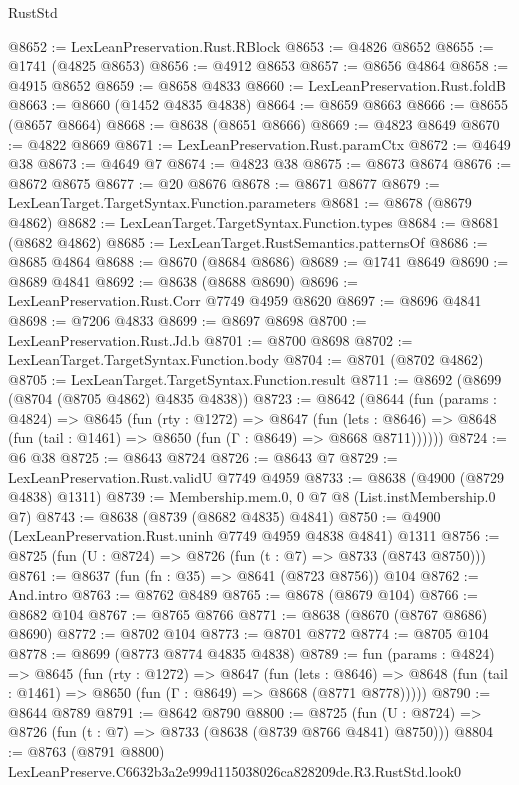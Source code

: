 \begin{lexlean}{RustStd}
\begin{coremodule}
@8652 := LexLeanPreservation.Rust.RBlock
@8653 := @4826 @8652
@8655 := @1741 (@4825 @8653)
@8656 := @4912 @8653
@8657 := @8656 @4864
@8658 := @4915 @8652
@8659 := @8658 @4833
@8660 := LexLeanPreservation.Rust.foldB
@8663 := @8660 (@1452 @4835 @4838)
@8664 := @8659 @8663
@8666 := @8655 (@8657 @8664)
@8668 := @8638 (@8651 @8666)
@8669 := @4823 @8649
@8670 := @4822 @8669
@8671 := LexLeanPreservation.Rust.paramCtx
@8672 := @4649 @38
@8673 := @4649 @7
@8674 := @4823 @38
@8675 := @8673 @8674
@8676 := @8672 @8675
@8677 := @20 @8676
@8678 := @8671 @8677
@8679 := LexLeanTarget.TargetSyntax.Function.parameters
@8681 := @8678 (@8679 @4862)
@8682 := LexLeanTarget.TargetSyntax.Function.types
@8684 := @8681 (@8682 @4862)
@8685 := LexLeanTarget.RustSemantics.patternsOf
@8686 := @8685 @4864
@8688 := @8670 (@8684 @8686)
@8689 := @1741 @8649
@8690 := @8689 @4841
@8692 := @8638 (@8688 @8690)
@8696 := LexLeanPreservation.Rust.Corr @7749 @4959 @8620
@8697 := @8696 @4841
@8698 := @7206 @4833
@8699 := @8697 @8698
@8700 := LexLeanPreservation.Rust.Jd.b
@8701 := @8700 @8698
@8702 := LexLeanTarget.TargetSyntax.Function.body
@8704 := @8701 (@8702 @4862)
@8705 := LexLeanTarget.TargetSyntax.Function.result
@8711 := @8692 (@8699 (@8704 (@8705 @4862) @4835 @4838))
@8723 := @8642
    (@8644
      (fun (params : @4824) =>
      @8645
        (fun (rty : @1272) =>
        @8647
          (fun (lets : @8646) =>
          @8648 (fun (tail : @1461) => @8650 (fun (Γ : @8649) => @8668 @8711))))))
@8724 := @6 @38
@8725 := @8643 @8724
@8726 := @8643 @7
@8729 := LexLeanPreservation.Rust.validU @7749 @4959
@8733 := @8638 (@4900 (@8729 @4838) @1311)
@8739 := Membership.mem.{0, 0} @7 @8 (List.instMembership.{0} @7)
@8743 := @8638 (@8739 (@8682 @4835) @4841)
@8750 := @4900 (LexLeanPreservation.Rust.uninh @7749 @4959 @4838 @4841) @1311
@8756 := @8725 (fun (U : @8724) => @8726 (fun (t : @7) => @8733 (@8743 @8750)))
@8761 := @8637 (fun (fn : @35) => @8641 (@8723 @8756)) @104
@8762 := And.intro
@8763 := @8762 @8489
@8765 := @8678 (@8679 @104)
@8766 := @8682 @104
@8767 := @8765 @8766
@8771 := @8638 (@8670 (@8767 @8686) @8690)
@8772 := @8702 @104
@8773 := @8701 @8772
@8774 := @8705 @104
@8778 := @8699 (@8773 @8774 @4835 @4838)
@8789 := fun (params : @4824) =>
  @8645
    (fun (rty : @1272) =>
    @8647
      (fun (lets : @8646) =>
      @8648 (fun (tail : @1461) => @8650 (fun (Γ : @8649) => @8668 (@8771 @8778)))))
@8790 := @8644 @8789
@8791 := @8642 @8790
@8800 := @8725 (fun (U : @8724) => @8726 (fun (t : @7) => @8733 (@8638 (@8739 @8766 @4841) @8750)))
@8804 := @8763 (@8791 @8800) LexLeanPreserve.C6632b3a2e999d115038026ca828209de.R3.RustStd.look0

\end{coremodule}
\end{lexlean}
